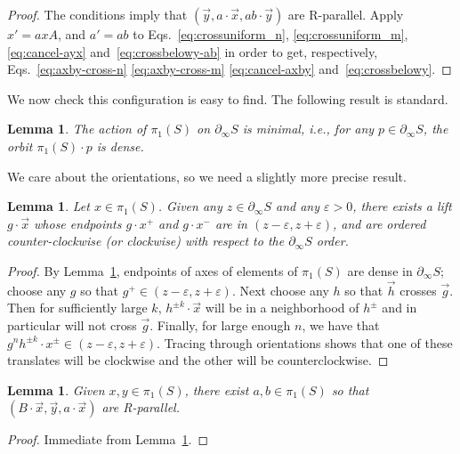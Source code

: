 \documentclass[11pt]{amsart}
\newcommand{\ora}[1]{\overrightarrow{#1}}
\numberwithin{equation}{section}
\numberwithin{figure}{section}
\newtheorem{lemma}[theorem]{Lemma}
\theoremstyle{definition}
\theoremstyle{plain}
\renewcommand{\epsilon}{\varepsilon}
\begin{document}
\begin{proof}
  The conditions imply that
  $(\ora{y}, a \cdot \ora{x}, ab \cdot \ora{y})$ are R-parallel.
  Apply $x' = axA$, and $a' = ab$ to Eqs.~\eqref{eq:crossuniform_n},  \eqref{eq:crossuniform_m}, \eqref{eq:cancel-ayx} and~\eqref{eq:crossbelowy-ab} in order to get, respectively, Eqs.~\eqref{eq:axby-cross-n}
    \eqref{eq:axby-cross-m}
    \eqref{eq:cancel-axby} and~\eqref{eq:crossbelowy}.
\end{proof}

We now check this configuration is easy to find. The following result
is standard.

\begin{lemma}
The action of $\pi_1(S)$ on $\partial_{\infty} S$ is minimal,
i.e., for any $p \in \partial_{\infty} S$, the orbit
$\pi_1(S)\cdot p$ is dense.
\label{lem:minimal}
\end{lemma}

We care about the orientations, so we need a slightly more precise result.

\begin{lemma}
Let $x \in \pi_1(S)$.
Given any $z \in \partial_\infty  S$
and any $\epsilon>0$, there exists a lift $g \cdot \ora{x}$ whose
endpoints $g\cdot x^+$ and $g\cdot x^-$ are in $(z-\epsilon,z+\epsilon)$, and are ordered counter-clockwise (or clockwise)
with respect to the $\partial_\infty S$ order.
\label{lem:diagonaldense}
\end{lemma}
\begin{proof}
By Lemma~\ref{lem:minimal}, endpoints of axes of elements of
$\pi_1(S)$ are dense in $\partial_\infty S$; choose any $g$ so that
$g^+ \in (z-\epsilon,z+\epsilon)$. Next choose any $h$ so that
$\ora{h}$ crosses $\ora{g}$. Then for sufficiently large $k$, $h^{\pm k}\cdot
\ora{x}$ will be in a neighborhood of $h^{\pm}$ and in particular will
not cross $\ora{g}$.
Finally, for large enough $n$, we have
that $g^n h^{\pm k} \cdot x^{\pm} \in (z-\epsilon,z+\epsilon)$.
Tracing through orientations shows that one of these translates will
be clockwise and the other will be counterclockwise.
\end{proof}

\begin{lemma}\label{lem:initial}
  Given $x, y \in \pi_1(S)$, there exist $a,b \in \pi_1(S)$ so that
  $(B \cdot \ora{x}, \ora{y}, a \cdot \ora{x})$ are R-parallel.
\end{lemma}
\begin{proof}
  Immediate from Lemma~\ref{lem:diagonaldense}.
\end{proof}
\end{document}
